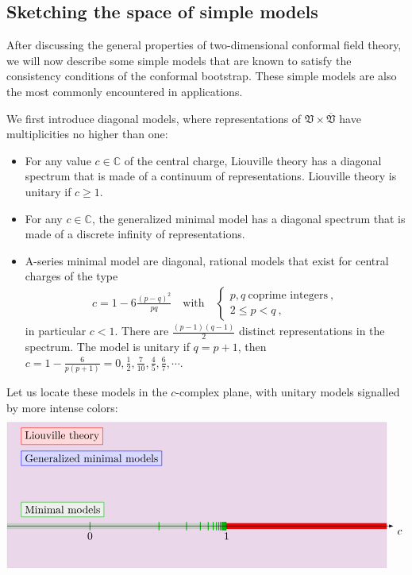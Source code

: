 \documentclass[12pt, a4paper, notitlepage, twoside]{report}
\numberwithin{equation}{section}
\theoremstyle{break}
\begin{document}
\subsection{Sketching the space of simple models \label{secmomo}}

After discussing the general properties of two-dimensional conformal field theory, we will now describe some simple models that are known to satisfy the consistency conditions of the conformal bootstrap.
These simple models are also the most commonly encountered in applications.  

We first introduce diagonal models, where representations of $\mathfrak{V}\times \overline{\mathfrak{V}}$ have multiplicities no higher than one:
\begin{itemize}
 \item For any value $c\in\mathbb{C}$ of the central charge, Liouville theory
has a diagonal spectrum that is made of a continuum of representations.
Liouville theory is unitary if $c\geq 1$. 
\item For any $c\in\mathbb{C}$, the generalized minimal model has a diagonal spectrum that is made of a discrete infinity of representations.
\item A-series minimal model are diagonal, rational models that exist for central charges of the type
\begin{align}
 c = 1 - 6 \frac{(p-q)^2}{pq}  \quad \text{with} \quad \left\{\begin{array}{l}  p,q \ \text{coprime  integers}\ , \\ 2\leq p<q\ , \end{array}\right.  
\label{cpq}
\end{align}
in particular $c <1$.
There are $\frac{(p-1)(q-1)}{2}$ distinct representations in the spectrum.
The model is unitary if $q=p+1$, then $c=1-\frac{6}{p(p+1)}=0,\frac12,\frac{7}{10},\frac45, \frac67,\cdots$.
\end{itemize}
Let us locate these models in the $c$-complex plane, with unitary models signalled by more intense colors:
\begin{align}
 \begin{tikzpicture}[scale = 4.5, baseline=(current  bounding  box.center)]
 \filldraw [blue!50!red, opacity = .15] (2.15, -.3) -- (2.15, .75) -- (-.6, .75) -- (-.6, -.3) -- cycle;
 \node [draw = red, fill = red!15, right] at (-.5, .65) {Liouville theory};
 \node [draw = blue, fill = blue!15, right] at (-.5, .49) {Generalized minimal models};
 \node[draw = green!70!black, fill = green!16!black!7, right] at (-.5, .12) {Minimal models};
  \filldraw [red] (.98, -.02) -- (.98, .02) -- (2.15, .02) -- (2.15, -.02) -- cycle;
  \filldraw [green!70!black, opacity = .15] (-.6, -.02) -- (-.6, .02) -- (.98, .02) -- (.98, -.02) -- cycle;
 \foreach \p in {2,...,20}
  {
  \draw [green!70!black, thick] ({1-6/(\p*(\p+1))}, -.03) -- ({1-6/(\p*(\p+1))}, .03);
  }
  \node [below] at (0, -.02) {$0$};  \node [below] at (.99, -.02) {$1$};
  \draw[-latex] (-.6, 0) -- (2.2, 0) node [below right] {$c$};
\end{tikzpicture}
\end{align}
\end{document}
